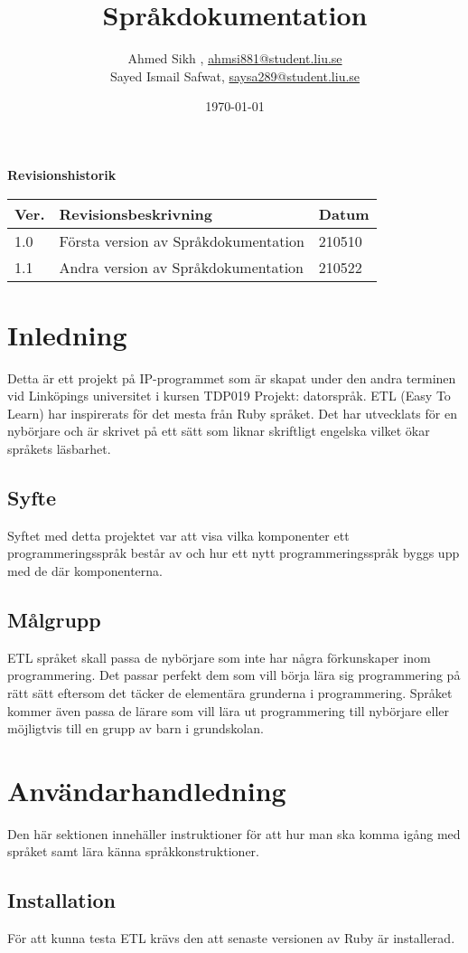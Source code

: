 \documentclass{TDP019mall}
\author{Ahmed Sikh , \url{ahmsi881@student.liu.se}\\
Sayed Ismail Safwat, \url{saysa289@student.liu.se}}
\title{Språkdokumentation}
\date{\today}
\begin{document}
\projectpage
\textbf{Revisionshistorik}
\begin{table}[!h]
\begin{tabularx}{\linewidth}{|l|X|l|}
\hline
Ver. & Revisionsbeskrivning & Datum \\\hline
1.0 & Första version av Språkdokumentation & 210510 \\\hline
1.1 & Andra version av Språkdokumentation & 210522 \\\hline
\end{tabularx}
\end{table}
\tableofcontents
\newpage



\newpage
\section{Inledning}
Detta är ett projekt på IP-programmet som är skapat under den andra terminen vid Linköpings universitet i kursen TDP019 Projekt: datorspråk.
ETL (Easy To Learn) har inspirerats för det mesta från Ruby språket. Det har utvecklats för en nybörjare och är skrivet på ett sätt som 
liknar skriftligt engelska vilket ökar språkets läsbarhet.

\subsection{Syfte}
Syftet med detta projektet var att visa vilka komponenter ett programmeringsspråk består av och hur ett nytt programmeringsspråk byggs upp med de där komponenterna. 

\subsection{Målgrupp}
ETL språket skall passa de nybörjare som inte har några förkunskaper inom programmering. Det passar perfekt dem som vill börja lära 
sig programmering på rätt sätt eftersom det täcker de elementära grunderna i programmering. Språket kommer även passa de lärare som vill lära
ut programmering till nybörjare eller möjligtvis till en grupp av barn i grundskolan.

\newpage
\section{Användarhandledning}
Den här sektionen innehäller instruktioner för att hur man ska komma igång med språket samt lära känna språkkonstruktioner. 

\subsection{Installation}
För att kunna testa ETL krävs den att senaste versionen av Ruby är installerad.
\end{document}
